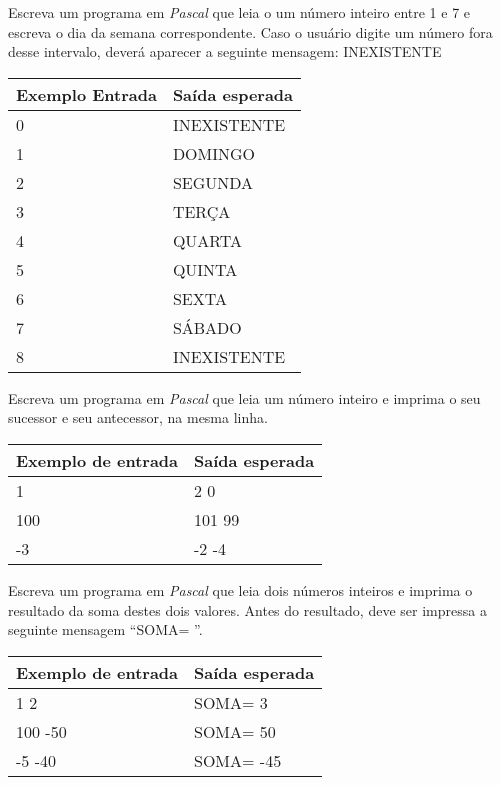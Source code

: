 \item Escreva um programa em \emph{Pascal} que leia o um número inteiro entre 1 e 7 e escreva o dia da semana correspondente. Caso o usuário digite um número fora desse intervalo, deverá aparecer a seguinte  mensagem: INEXISTENTE

\begin{center}
\begin{tabular}{|l|l|} \hline
Exemplo Entrada & Saída esperada \\ \hline
0 & INEXISTENTE \\ \hline
1 & DOMINGO \\ \hline
2 & SEGUNDA \\ \hline
3 & TERÇA \\ \hline
4 & QUARTA \\ \hline
5 & QUINTA \\ \hline
6 & SEXTA \\ \hline
7 & SÁBADO \\ \hline
8 & INEXISTENTE \\ \hline
\end{tabular}
\end{center}
\item Escreva um programa em \emph{Pascal} que leia um número inteiro e 
imprima o seu sucessor e seu antecessor, na mesma linha.

\begin{center}
\begin{tabular}{|l|l|} \hline
Exemplo de entrada & Saída esperada \\ \hline
1               & 2 0 \\ \hline
100             & 101 99 \\ \hline
-3              & -2 -4 \\ \hline
\end{tabular}
\end{center}

\item Escreva um programa em \emph{Pascal} que leia dois números inteiros e 
imprima o resultado da soma destes dois valores. Antes do resultado, deve ser 
impressa a seguinte mensagem ``SOMA= ''.


\begin{center}
\begin{tabular}{|l|l|} \hline
Exemplo de entrada & Saída esperada \\ \hline
1 2             & SOMA= 3 \\ \hline
100 -50         & SOMA= 50 \\ \hline
-5 -40          & SOMA= -45 \\ \hline
\end{tabular}
\end{center}


